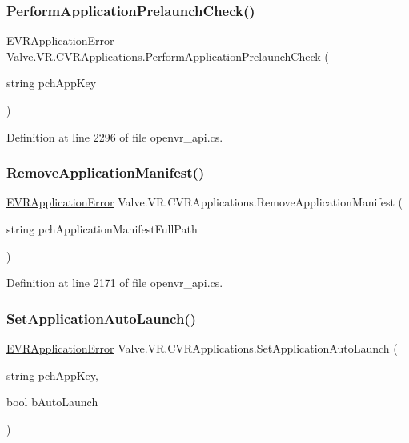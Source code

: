 \subsubsection{\texorpdfstring{PerformApplicationPrelaunchCheck()}{PerformApplicationPrelaunchCheck()}}
{\footnotesize\ttfamily \mbox{\hyperlink{namespace_valve_1_1_v_r_a3488adab8a219b579fcee50f4e63a8b6}{E\+V\+R\+Application\+Error}} Valve.\+V\+R.\+C\+V\+R\+Applications.\+Perform\+Application\+Prelaunch\+Check (\begin{DoxyParamCaption}\item[{string}]{pch\+App\+Key }\end{DoxyParamCaption})}



Definition at line 2296 of file openvr\+\_\+api.\+cs.

\mbox{\label{class_valve_1_1_v_r_1_1_c_v_r_applications_a1185bc8e37e263c6963c9c59fd6b0dd9}} 
\subsubsection{\texorpdfstring{RemoveApplicationManifest()}{RemoveApplicationManifest()}}
{\footnotesize\ttfamily \mbox{\hyperlink{namespace_valve_1_1_v_r_a3488adab8a219b579fcee50f4e63a8b6}{E\+V\+R\+Application\+Error}} Valve.\+V\+R.\+C\+V\+R\+Applications.\+Remove\+Application\+Manifest (\begin{DoxyParamCaption}\item[{string}]{pch\+Application\+Manifest\+Full\+Path }\end{DoxyParamCaption})}



Definition at line 2171 of file openvr\+\_\+api.\+cs.

\mbox{\label{class_valve_1_1_v_r_1_1_c_v_r_applications_af7ec150b8228b6af3d2ea930df7cd2a5}} 
\subsubsection{\texorpdfstring{SetApplicationAutoLaunch()}{SetApplicationAutoLaunch()}}
{\footnotesize\ttfamily \mbox{\hyperlink{namespace_valve_1_1_v_r_a3488adab8a219b579fcee50f4e63a8b6}{E\+V\+R\+Application\+Error}} Valve.\+V\+R.\+C\+V\+R\+Applications.\+Set\+Application\+Auto\+Launch (\begin{DoxyParamCaption}\item[{string}]{pch\+App\+Key,  }\item[{bool}]{b\+Auto\+Launch }\end{DoxyParamCaption})}



